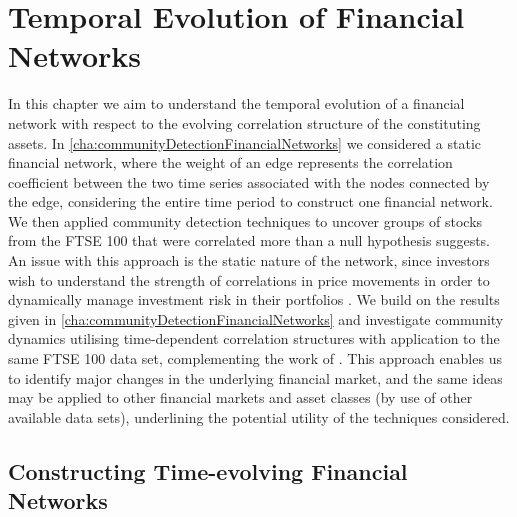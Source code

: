 
\chapter{Temporal Evolution of Financial Networks}

\label{cha:temporalEvolutionFinancialNetworks}


In this chapter we aim to understand the temporal evolution of a financial network with respect to the evolving correlation structure of the constituting assets.
In \cref{cha:communityDetectionFinancialNetworks} we considered a static financial network, where the weight of an edge represents the correlation coefficient between the two time series associated with the nodes connected by the edge, considering the entire time period to construct one financial network.
We then applied community detection techniques to uncover groups of stocks from the FTSE 100 that were correlated more than a null hypothesis suggests.
An issue with this approach is the static nature of the network, since investors wish to understand the strength of correlations in price movements in order to dynamically manage investment risk in their portfolios \cite{FPW+11}.
We build on the results given in \cref{cha:communityDetectionFinancialNetworks} and investigate community dynamics utilising time-dependent correlation structures with application to the same FTSE 100 data set, complementing the work of \cite{OCK+02,OKK03,BD10,FPM+10,FPW+11}.
This approach enables us to identify major changes in the underlying financial market, and the same ideas may be applied to other financial markets and asset classes (by use of other available data sets), underlining the potential utility of the techniques considered.


\section{Constructing Time-evolving Financial Networks}
\label{sec:timeEvolvingFinancialNetwork}

